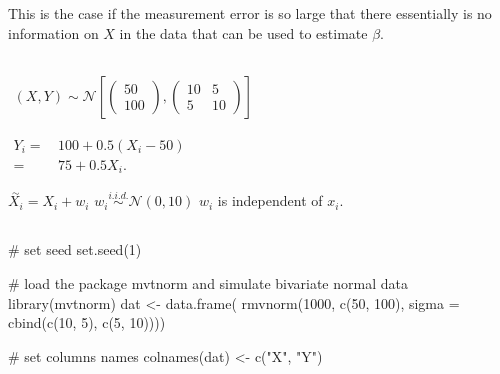 \documentclass[
  letterpaper,
  DIV=11,
  numbers=noendperiod]{scrartcl}
\newenvironment{Shaded}{\begin{snugshade}}{\end{snugshade}}
\newcommand{\AttributeTok}[1]{\textcolor[rgb]{0.40,0.45,0.13}{#1}}
\newcommand{\CommentTok}[1]{\textcolor[rgb]{0.37,0.37,0.37}{#1}}
\newcommand{\DecValTok}[1]{\textcolor[rgb]{0.68,0.00,0.00}{#1}}
\newcommand{\FunctionTok}[1]{\textcolor[rgb]{0.28,0.35,0.67}{#1}}
\newcommand{\NormalTok}[1]{\textcolor[rgb]{0.00,0.23,0.31}{#1}}
\newcommand{\OtherTok}[1]{\textcolor[rgb]{0.00,0.23,0.31}{#1}}
\newcommand{\StringTok}[1]{\textcolor[rgb]{0.13,0.47,0.30}{#1}}
\begin{document}
This is the case if the measurement error is so large that there
essentially is no information on \(X\) in the data that can be used to
estimate \(\beta\).

\hypertarget{section-4}{%
\subsection{}\label{section-4}}

\(\begin{align} (X, Y) \sim \mathcal{N}\left[\begin{pmatrix}50\\ 100\end{pmatrix},\begin{pmatrix}10 & 5 \\ 5 & 10 \end{pmatrix}\right] \tag{9.3} \end{align}\)

\(\begin{align*} Y_i =& \, 100 + 0.5 (X_i - 50) \\ =& \, 75 + 0.5 X_i. \tag{9.4} \end{align*}\)

\(\overset{\sim}{X_i} = X_i + w_i\)
\(w_i \overset{i.i.d.}{\sim} \mathcal{N}(0,10)\) \(w_i\) is independent
of \(x_i\).

\hypertarget{section-5}{%
\subsection{}\label{section-5}}

\begin{Shaded}
\begin{Highlighting}[]
\CommentTok{\# set seed}
\FunctionTok{set.seed}\NormalTok{(}\DecValTok{1}\NormalTok{)}

\CommentTok{\# load the package \textquotesingle{}mvtnorm\textquotesingle{} and simulate bivariate normal data}
\FunctionTok{library}\NormalTok{(mvtnorm)}
\NormalTok{dat }\OtherTok{\textless{}{-}} \FunctionTok{data.frame}\NormalTok{(}
  \FunctionTok{rmvnorm}\NormalTok{(}\DecValTok{1000}\NormalTok{, }\FunctionTok{c}\NormalTok{(}\DecValTok{50}\NormalTok{, }\DecValTok{100}\NormalTok{), }
          \AttributeTok{sigma =} \FunctionTok{cbind}\NormalTok{(}\FunctionTok{c}\NormalTok{(}\DecValTok{10}\NormalTok{, }\DecValTok{5}\NormalTok{), }\FunctionTok{c}\NormalTok{(}\DecValTok{5}\NormalTok{, }\DecValTok{10}\NormalTok{))))}

\CommentTok{\# set columns names}
\FunctionTok{colnames}\NormalTok{(dat) }\OtherTok{\textless{}{-}} \FunctionTok{c}\NormalTok{(}\StringTok{"X"}\NormalTok{, }\StringTok{"Y"}\NormalTok{)}
\end{Highlighting}
\end{Shaded}
\end{document}
